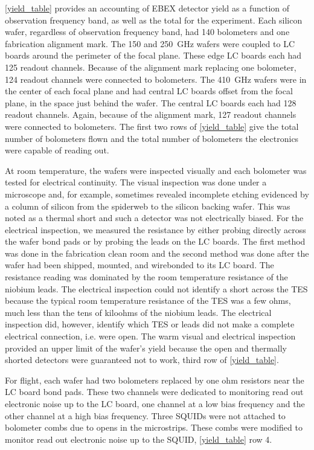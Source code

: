 \TAB\ref{yield_table} provides an accounting of \ac{EBEX} detector yield as a function of observation frequency band, as well as the total for the experiment.
Each silicon wafer, regardless of observation frequency band, had 140 bolometers and one fabrication alignment mark. %
The 150 and 250~GHz wafers were coupled to \ac{LC} boards around the perimeter of the focal plane. These edge \ac{LC} boards each had 125 readout channels. Because of the alignment mark replacing one bolometer, 124 readout channels were connected to bolometers.  
The 410~GHz wafers were in the center of each focal plane and had central \ac{LC} boards offset from the focal plane, in the space just behind the wafer. The central \ac{LC} boards each had 128 readout channels. Again, because of the alignment mark, 127 readout channels were connected to bolometers. %
The first two rows of \TAB\ref{yield_table} give the total number of bolometers flown and the total number of bolometers the electronics were capable of reading out. 

At room temperature, the wafers were inspected visually and each bolometer was tested for electrical continuity. 
The visual inspection was done under a microscope and, for example, sometimes revealed incomplete etching evidenced by a column of silicon from the spiderweb to the silicon backing wafer. 
This was noted as a thermal short and such a detector was not electrically biased. 
For the electrical inspection, we measured the resistance by either probing directly across the wafer bond pads or by probing the leads on the \ac{LC} boards. 
The first method was done in the fabrication clean room and the second method was done after the wafer had been shipped, mounted, and wirebonded to its \ac{LC} board. 
The resistance reading was dominated by the room temperature resistance of the niobium leads. 
The electrical inspection could not identify a short across the \ac{TES} because the typical room temperature resistance of the \ac{TES} was a few ohms, much less than the tens of kiloohms of the niobium leads. 
The electrical inspection did, however, identify which \ac{TES} or leads did not make a complete electrical connection, i.e. were open. 
The warm visual and electrical inspection provided an upper limit of the wafer's yield because the open and thermally shorted detectors were guaranteed not to work, third row of \TAB\ref{yield_table}. 

For flight, each wafer had two bolometers replaced by one ohm resistors near the \ac{LC} board bond pads. 
These two channels were dedicated to monitoring read out electronic noise up to the \ac{LC} board, one channel at a low bias frequency and the other channel at a high bias frequency. 
Three \ac{SQUID}s were not attached to bolometer combs due to opens in the microstrips. These combs were modified to monitor read out electronic noise up to the \ac{SQUID}, \TAB\ref{yield_table} row 4. 

